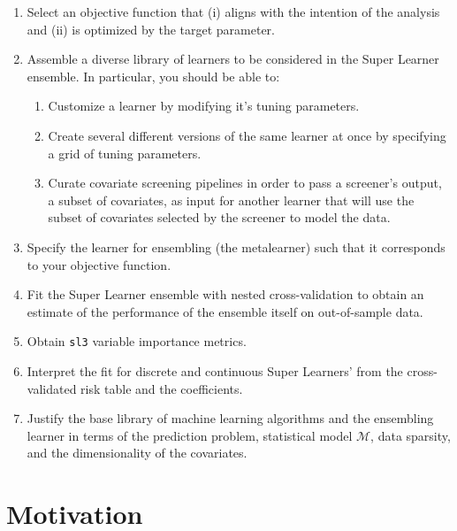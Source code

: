 \documentclass[
  12pt, krantz2,
]{krantz}
\newcommand{\passthrough}[1]{#1}
\providecommand{\tightlist}{%
  \setlength{\itemsep}{0pt}\setlength{\parskip}{0pt}}
\newcommand{\M}{\mathcal{M}}
\newcommand{\1}{\mathbbm{1}}
\theoremstyle{definition}
\theoremstyle{definition}
\theoremstyle{definition}
\theoremstyle{definition}
\theoremstyle{remark}
\begin{document}
\begin{enumerate}
\def\labelenumi{\arabic{enumi}.}
\item
  Select an objective function that (i) aligns with the intention of the
  analysis and (ii) is optimized by the target parameter.
\item
  Assemble a diverse library of learners to be considered in the Super Learner
  ensemble. In particular, you should be able to:

  \begin{enumerate}
  \def\labelenumii{\alph{enumii}.}
  \tightlist
  \item
    Customize a learner by modifying it's tuning parameters.
  \item
    Create several different versions of the same learner at once by
    specifying a grid of tuning parameters.
  \item
    Curate covariate screening pipelines in order to pass a screener's
    output, a subset of covariates, as input for another learner that will
    use the subset of covariates selected by the screener to model the data.
  \end{enumerate}
\item
  Specify the learner for ensembling (the metalearner) such that it corresponds
  to your objective function.
\item
  Fit the Super Learner ensemble with nested cross-validation to obtain an
  estimate of the performance of the ensemble itself on out-of-sample data.
\item
  Obtain \passthrough{\lstinline!sl3!} variable importance metrics.
\item
  Interpret the fit for discrete and continuous Super Learners' from the
  cross-validated risk table and the coefficients.
\item
  Justify the base library of machine learning algorithms and the ensembling
  learner in terms of the prediction problem, statistical model \(\M\), data
  sparsity, and the dimensionality of the covariates.
\end{enumerate}

\hypertarget{motivation}{%
\section*{Motivation}\label{motivation}}
\end{document}
